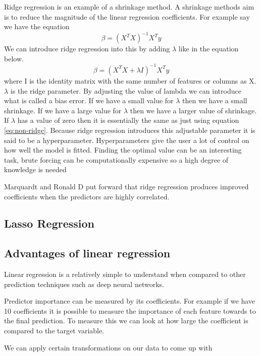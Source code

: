 Ridge regression is an example of a shrinkage method. A shrinkage methods aim is to reduce the magnitude of the linear regression coefficients. For example say we have the equation
\begin{equation}\label{eq:non-ridge}
\beta = (X^T X)^{-1}X^T y
\end{equation}
We can introduce ridge regression into this by adding $\lambda$ like in the equation below.
\begin{equation}
\beta = (X^T X + \lambda I)^{-1}X^T y
\end{equation}
where I is the identity matrix with the same number of features or columns as X. $\lambda$ is the ridge parameter. By adjusting the value of lambda we can introduce what is called a bias error. If we have a small value for $\lambda$ then we have a small shrinkage. If we have a large value for $\lambda$ then we have a larger value of shrinkage. If $\lambda$ has a value of zero then it is essentially the same as just using equation \ref{eq:non-ridge}. Because ridge regression introduces this adjustable parameter it is said to be a hyperparameter. Hyperparameters give the user a lot of control on how well the model is fitted. Finding the optimal value can be an interesting task, brute forcing can be computationally expensive so a high degree of knowledge is needed

Marquardt and Ronald D\cite{doi:10.1080/00031305.1975.10479105} put forward that ridge regression produces improved coefficients when the predictors are highly correlated. 

\subsection*{Lasso Regression}

\subsection*{Advantages of linear regression}

Linear regression is a relatively simple to understand when compared to other prediction techniques such as deep neural networks.

Predictor importance can be measured by its coefficients. For example if we have 10 coefficients it is possible to measure the importance of each feature towards to the final prediction. To measure this we can look at how large the coefficient is compared to the target variable.

We can apply certain transformations on our data to come up with 
